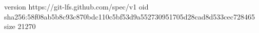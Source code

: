 version https://git-lfs.github.com/spec/v1
oid sha256:58f08ab5b8c93c870bdc110c5bf53d9a552730951705d28cad8d533cec728465
size 21270
